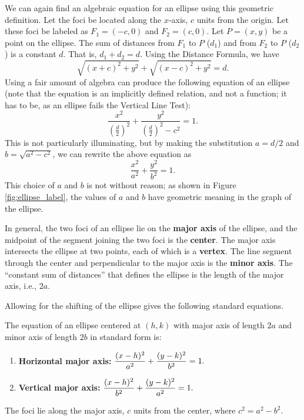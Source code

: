 	We can again find an algebraic equation for an ellipse using this geometric definition. Let the foci be located along the $x$-axis, $c$ units from the origin. Let these foci be labeled as $F_1 = (-c,0)$ and $F_2=(c,0)$. Let $P=(x,y)$ be a point on the ellipse. The sum of distances from $F_1$ to $P$ ($d_1$) and from $F_2$ to $P$ ($d_2$) is a constant $d$. That is, $d_1+d_2=d$. Using the Distance Formula, we have 
	$$\sqrt{(x+c)^2+y^2} + \sqrt{(x-c)^2+y^2} = d.$$ Using a fair amount of algebra can produce the following equation of an ellipse (note that the equation is an implicitly defined relation, and not a function; it has to be, as an ellipse fails the Vertical Line Test):
	$$\frac{x^2}{\left(\frac d2\right)^2} + \frac{y^2}{\left(\frac d2\right)^2-c^2} = 1.$$
	This is not particularly illuminating, but by making the substitution $a=d/2$ and $b=\sqrt{a^2-c^2}$, we can rewrite the above equation as 
	$$\frac{x^2}{a^2} + \frac{y^2}{b^2} = 1.$$ This choice of $a$ and $b$ is not without reason; as shown in Figure \ref{fig:ellipse_label}, the values of $a$ and $b$ have geometric meaning in the graph of the ellipse. 
	
	In general, the two foci of an ellipse lie on the \textbf{major axis} of the ellipse, and the midpoint of the segment joining the two foci is the \textbf{center}. The major axis intersects the ellipse at two points, each of which is a \textbf{vertex}. The line segment through the center and perpendicular to the major axis is the \textbf{minor axis}. The ``constant sum of distances'' that defines the ellipse is the length of the major axis, i.e., $2a$.
	
	Allowing for the shifting of the ellipse gives the following standard equations.
	
	{The equation of an ellipse centered at $(h,k)$ with major axis of length $2a$ and minor axis of length $2b$ in standard form is:
	\begin{enumerate}
	\item	\textbf{Horizontal major axis:} $\displaystyle \frac{(x-h)^2}{a^2}+\frac{(y-k)^2}{b^2}=1.$
	
	\item	\textbf{Vertical major axis:} $\displaystyle \frac{(x-h)^2}{b^2}+\frac{(y-k)^2}{a^2}=1.$
	\end{enumerate}
	The foci lie along the major axis, $c$ units from the center, where $c^2=a^2-b^2$.
	}
	
